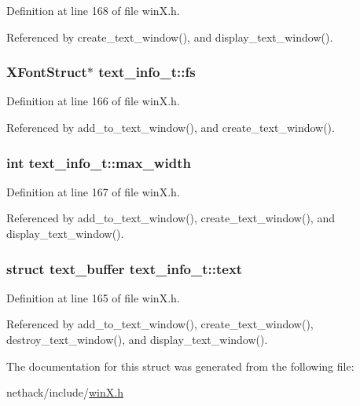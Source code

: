 Definition at line 168 of file win\+X.\+h.



Referenced by create\+\_\+text\+\_\+window(), and display\+\_\+text\+\_\+window().

\hypertarget{structtext__info__t_aca6a8ac387270498884c09d6ca405ed0}{
\subsubsection[{fs}]{\setlength{\rightskip}{0pt plus 5cm}X\+Font\+Struct$\ast$ text\+\_\+info\+\_\+t\+::fs}}\label{structtext__info__t_aca6a8ac387270498884c09d6ca405ed0}


Definition at line 166 of file win\+X.\+h.



Referenced by add\+\_\+to\+\_\+text\+\_\+window(), and create\+\_\+text\+\_\+window().

\hypertarget{structtext__info__t_a2c55a95fd96aa06a6a2910929affdb92}{
\subsubsection[{max\+\_\+width}]{\setlength{\rightskip}{0pt plus 5cm}int text\+\_\+info\+\_\+t\+::max\+\_\+width}}\label{structtext__info__t_a2c55a95fd96aa06a6a2910929affdb92}


Definition at line 167 of file win\+X.\+h.



Referenced by add\+\_\+to\+\_\+text\+\_\+window(), create\+\_\+text\+\_\+window(), and display\+\_\+text\+\_\+window().

\hypertarget{structtext__info__t_a5f680972356bbaddd025996082d0c389}{
\subsubsection[{text}]{\setlength{\rightskip}{0pt plus 5cm}struct {\bf text\+\_\+buffer} text\+\_\+info\+\_\+t\+::text}}\label{structtext__info__t_a5f680972356bbaddd025996082d0c389}


Definition at line 165 of file win\+X.\+h.



Referenced by add\+\_\+to\+\_\+text\+\_\+window(), create\+\_\+text\+\_\+window(), destroy\+\_\+text\+\_\+window(), and display\+\_\+text\+\_\+window().



The documentation for this struct was generated from the following file\+:\begin{DoxyCompactItemize}
\item 
nethack/include/\hyperlink{winX_8h}{win\+X.\+h}\end{DoxyCompactItemize}
